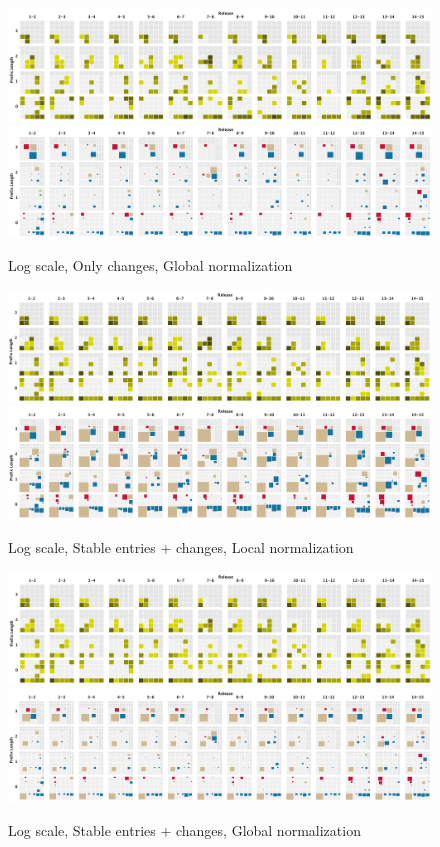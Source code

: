 
\begin{figure}[htb]
  \centering
  \includegraphics[width=17cm]{images/heatmap101.png} 
  \includegraphics[width=17cm]{images/squaremap101.png}
  \caption{Log scale, Only changes, Global normalization}
\end{figure}
\begin{figure}[htb]
  \centering
  \includegraphics[width=17cm]{images/heatmap110.png} 
  \includegraphics[width=17cm]{images/squaremap110.png}
  \caption{Log scale, Stable entries + changes, Local normalization}
\end{figure}
\begin{figure}[htb]
  \centering
  \includegraphics[width=17cm]{images/heatmap111.png} 
  \includegraphics[width=17cm]{images/squaremap111.png}
  \caption{Log scale, Stable entries + changes, Global normalization}
\end{figure}